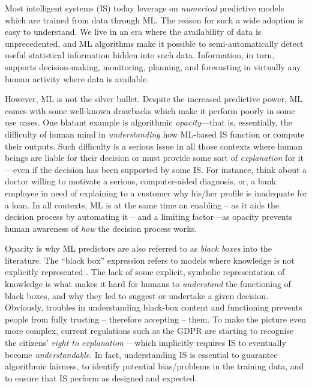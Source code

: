 \documentclass[12pt,a4paper,openright,twoside]{book}
\begin{document}
Most intelligent systems (IS) today leverage on \emph{numerical} predictive models which are trained from data through ML.
%
The reason for such a wide adoption is easy to understand.
%
We live in an era where the availability of data is unprecedented, and ML algorithms make it possible to semi-automatically detect useful statistical information hidden into such data.
%
Information, in turn, supports decision-making, monitoring, planning, and forecasting in virtually any human activity where data is available.

However, ML is not the silver bullet.
%
Despite the increased predictive power, ML comes with some well-known drawbacks which make it perform poorly in some use cases.
%
One blatant example is algorithmic \emph{opacity}---that is, essentially, the difficulty of human mind in \emph{understanding} how ML-based IS function or compute their outputs.
%
Such difficulty is a serious issue in all those contexts where human beings are liable for their decision or must provide some sort of \emph{explanation} for it---even if the decision has been supported by some IS.
%
For instance, think about a doctor willing to motivate a serious, computer-aided diagnosis, or, a bank employee in need of explaining to a customer why his/her profile is inadequate for a loan.
%
In all contexts, ML is at the same time an enabling -- as it aids the decision process by automating it -- and a limiting factor---as opacity prevents human awareness of \emph{how} the decision process works.

Opacity is why ML predictors are also referred to as \emph{black boxes} into the literature.
%
The ``black box'' expression refers to models where knowledge is not explicitly represented \cite{Lipton18}. 
%
The lack of some explicit, symbolic representation of knowledge is what makes it hard for humans to \emph{understand} the functioning of black boxes, and why they led to suggest or undertake a given decision.
%
Obviously, troubles in understanding black-box content and functioning prevents people from fully trusting -- therefore accepting -- them. 
%
To make the picture even more complex, current regulations such as the GDPR \cite{gdpr-voigt2017} are starting to recognise the citizens' \emph{right to explanation} \cite{explanation-aimag38}---which implicitly requires IS to eventually become \emph{understandable}.
%
In fact, understanding IS is essential to guarantee algorithmic fairness, to identify potential bias/problems in the training data, and to ensure that IS perform as designed and expected. 
\end{document}
